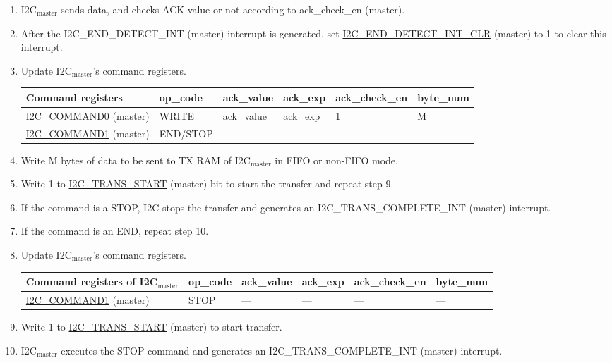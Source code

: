\documentclass[main\_\_EN.tex]{subfiles}
\begin{document}
\begin{enumerate}
\item I2C$_\text{master}$ sends data, and checks ACK value or not according to ack\_check\_en (master).

\item After the I2C\_END\_DETECT\_INT (master) interrupt is generated, set \hyperref[fielddesc:I2CENDDETECTINTCLR]{I2C\_END\_DETECT\_INT\_CLR} (master) to 1 to clear this interrupt.
\item Update I2C$_\text{master}$'s command registers.
\begin{longtable}{ | p{4cm} | p{2cm} | p{2cm} | p{2cm} |p{2cm} | p{2cm} |}
\hline\rowcolor{lightgray}
Command registers& op\_code & ack\_value&ack\_exp&ack\_check\_en&byte\_num  \\ \hline
\hyperref[fielddesc:I2CCOMMAND0]{I2C\_COMMAND0} (master)& WRITE& ack\_value&ack\_exp&1&M  \\ \hline
\hyperref[fielddesc:I2CCOMMAND1]{I2C\_COMMAND1} (master)& END/STOP& ---&---&---&---  \\ \hline
\end{longtable} 
\item Write M bytes of data to be sent to TX RAM of I2C$_\text{master}$ in FIFO or non-FIFO mode.
\item Write 1 to \hyperref[fielddesc:I2CTRANSSTART]{I2C\_TRANS\_START} (master) bit to start the transfer and repeat step 9.
\item If the command is a STOP, I2C stops the transfer and generates an I2C\_TRANS\_COMPLETE\_INT (master) interrupt.
\item If the command is an END, repeat step 10.
\item Update I2C$_\text{master}$'s command registers.
\begin{longtable}{ | p{4cm} | p{2cm} | p{2cm} | p{2cm} |p{2cm} | p{2cm} |}
\hline\rowcolor{lightgray}
Command registers of I2C$_\text{master}$& op\_code & ack\_value&ack\_exp&ack\_check\_en&byte\_num  \\ \hline
\hyperref[fielddesc:I2CCOMMAND1]{I2C\_COMMAND1} (master)& STOP& ---&---&---&---  \\ \hline
\end{longtable} 
\item Write 1 to \hyperref[fielddesc:I2CTRANSSTART]{I2C\_TRANS\_START} (master) to start transfer.
\item I2C$_\text{master}$ executes the STOP command and generates an I2C\_TRANS\_COMPLETE\_INT (master) interrupt.

\end{enumerate}
\end{document}
